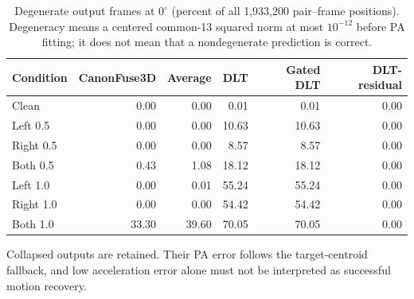\begin{table}[htbp]
\centering
\caption{Degenerate output frames at $0^\circ$ (percent of all 1,933,200 pair--frame positions). Degeneracy means a centered common-13 squared norm at most $10^{-12}$ before PA fitting; it does not mean that a nondegenerate prediction is correct.}
\label{tab:c07_degeneracy}
\small
\setlength{\tabcolsep}{4pt}
\begin{tabular}{lrrrrr}
\toprule
Condition & CanonFuse3D & Average & DLT & Gated DLT & DLT-residual \\
\midrule
Clean & 0.00 & 0.00 & 0.01 & 0.01 & 0.00 \\
Left 0.5 & 0.00 & 0.00 & 10.63 & 10.63 & 0.00 \\
Right 0.5 & 0.00 & 0.00 & 8.57 & 8.57 & 0.00 \\
Both 0.5 & 0.43 & 1.08 & 18.12 & 18.12 & 0.00 \\
Left 1.0 & 0.00 & 0.01 & 55.24 & 55.24 & 0.00 \\
Right 1.0 & 0.00 & 0.00 & 54.42 & 54.42 & 0.00 \\
Both 1.0 & 33.30 & 39.60 & 70.05 & 70.05 & 0.00 \\
\bottomrule
\end{tabular}
\par\smallskip\begin{minipage}{\linewidth}\footnotesize Collapsed outputs are retained. Their PA error follows the target-centroid fallback, and low acceleration error alone must not be interpreted as successful motion recovery.\end{minipage}
\end{table}


